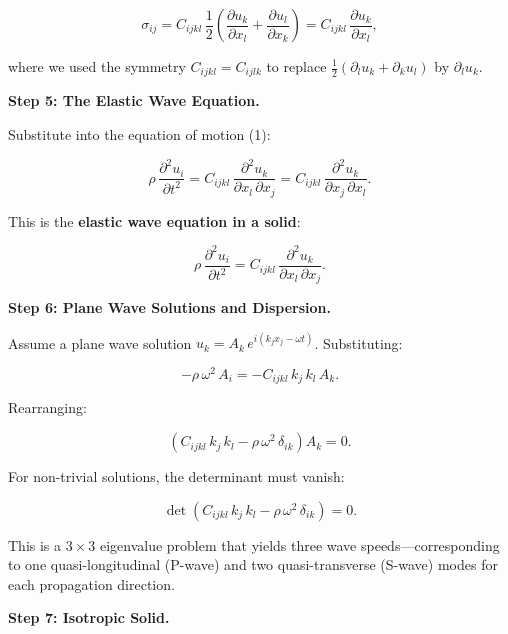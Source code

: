 \begin{equation}
\sigma_{ij} = C_{ijkl}\,\frac{1}{2}\left(\frac{\partial u_k}{\partial x_l} + \frac{\partial u_l}{\partial x_k}\right) = C_{ijkl}\,\frac{\partial u_k}{\partial x_l},
\end{equation}

where we used the symmetry $C_{ijkl} = C_{ijlk}$ to replace $\frac{1}{2}(\partial_l u_k + \partial_k u_l)$ by $\partial_l u_k$.

\textbf{Step 5: The Elastic Wave Equation.}

Substitute into the equation of motion (1):

\begin{equation}
\rho\,\frac{\partial^2 u_i}{\partial t^2} = C_{ijkl}\,\frac{\partial^2 u_k}{\partial x_l\,\partial x_j} = C_{ijkl}\,\frac{\partial^2 u_k}{\partial x_j\,\partial x_l}.
\end{equation}

This is the \textbf{elastic wave equation in a solid}:

\begin{equation}
\boxed{\rho\,\frac{\partial^2 u_i}{\partial t^2} = C_{ijkl}\,\frac{\partial^2 u_k}{\partial x_l\,\partial x_j}.}
\end{equation}

\textbf{Step 6: Plane Wave Solutions and Dispersion.}

Assume a plane wave solution $u_k = A_k\,e^{i(k_j x_j - \omega t)}$. Substituting:

\begin{equation}
-\rho\,\omega^2\,A_i = -C_{ijkl}\,k_j\,k_l\,A_k.
\end{equation}

Rearranging:

\begin{equation}
\left(C_{ijkl}\,k_j\,k_l - \rho\,\omega^2\,\delta_{ik}\right)A_k = 0.
\end{equation}

For non-trivial solutions, the determinant must vanish:

\begin{equation}
\det\left(C_{ijkl}\,k_j\,k_l - \rho\,\omega^2\,\delta_{ik}\right) = 0.
\end{equation}

This is a $3 \times 3$ eigenvalue problem that yields three wave speeds---corresponding to one quasi-longitudinal (P-wave) and two quasi-transverse (S-wave) modes for each propagation direction.

\textbf{Step 7: Isotropic Solid.}

